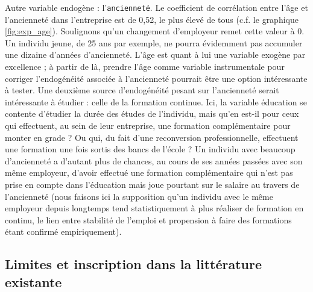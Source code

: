 \documentclass[a4paper, french, 11 pt]{article}\usepackage[]{graphicx}\usepackage[]{xcolor}
\begin{document}
        Autre variable endogène : l'\texttt{ancienneté}. Le coefficient de corrélation entre l’âge et l’ancienneté dans l’entreprise est de 0,52, le plus élevé de tous (c.f. le graphique \ref{fig:exp_age}). Soulignons qu'un changement d'employeur remet cette valeur à 0. Un individu jeune, de 25 ans par exemple, ne pourra évidemment pas accumuler une dizaine d’années d’ancienneté. L’âge est quant à lui une variable exogène par excellence ; à partir de là, prendre l’âge comme variable instrumentale pour corriger l’endogénéité associée à l’ancienneté pourrait être une option intéressante à tester. Une deuxième source d’endogénéité pesant sur l’ancienneté serait intéressante à étudier : celle de la formation continue. Ici, la variable éducation se contente d’étudier la durée des études de l’individu, mais qu’en est-il pour ceux qui effectuent, au sein de leur entreprise, une formation complémentaire pour monter en grade ? Ou qui, du fait d’une reconversion professionnelle, effectuent une formation une fois sortis des bancs de l’école ? Un individu avec beaucoup d’ancienneté a d’autant plus de chances, au cours de ses années passées avec son même employeur, d’avoir effectué une formation complémentaire qui n’est pas prise en compte dans l’éducation mais joue pourtant sur le salaire au travers de l’ancienneté (nous faisons ici la supposition qu’un individu avec le même employeur depuis longtemps tend statistiquement à plus réaliser de formation en continu, le lien entre stabilité de l’emploi et propension à faire des formations étant confirmé empiriquement).

\subsection{Limites et inscription dans la littérature existante}
\end{document}
